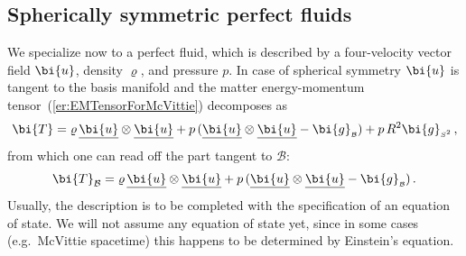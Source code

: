 \documentclass
[rmp,aps,twocolumn,showpacs,preprintnumbers,amsmath,amssymb]{revtex4}
\theoremstyle{plain}
\theoremstyle{definition}
\theoremstyle{remark}
\newcommand{\ul}[1]{\underline{#1}}
\newcommand{\sss}{\scriptscriptstyle}
\newcommand{\B}{\mathcal{B}}                      %
\newcommand{\Stwo}{{S^2}}                         %
\newcommand{\sB}{{\sss \B}}                       %
\newcommand{\sStwo}{{\sss \Stwo}}                 %
\newcommand{\gB}{\g_\sB}                          %
\newcommand{\gStwo}{\g_\sStwo}                    %
\newcommand{\g}{\bg}                            %
\newcommand{\bg}{\bi{g}}
\newcommand{\bu}{\bi{u}}
\newcommand{\bT}{\bi{T}}
\begin{document}
\subsection{Spherically symmetric perfect fluids}
\label{sec:ss-perfect-fluids}
%
We specialize now to a perfect fluid, which is described by a four-velocity 
vector field $\bu$, density $\varrho$, and pressure $p$. In case of spherical 
symmetry $\bu$ is tangent to the basis manifold and the matter energy-momentum 
tensor~(\ref{er:EMTensorForMcVittie}) decomposes as
%
\begin{equation}\label{eq:EMT-ss-perfect-fluid}
  \bT = \varrho\,\ul\bu\otimes\ul\bu + p\,(\ul\bu\otimes\ul\bu-\gB) 
      + p\,R^2\gStwo \,,
\end{equation}
%
from which one can read off the part tangent to $\B$:
%
\begin{equation}\label{eq:EMT-ss-perfect-fluid-B}
\bT_\B = \varrho\,\ul\bu\otimes\ul\bu + p\,(\ul\bu\otimes\ul\bu-\gB) \,.
\end{equation}
%
Usually, the description is to be completed with the specification of an 
equation of state. We will not assume any equation of state yet, since in 
some cases (e.g.~McVittie spacetime) this happens to be determined by 
Einstein's equation.
\end{document}
